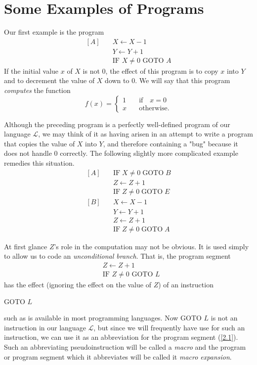 \documentclass[12pt,a4paper,twoside,openany]{book}
\begin{document}
\section{Some Examples of Programs}

Our first example is the program
\begin{equation*}
    \begin{array}{ll}[A]&\quad X\leftarrow X-1\\ &\quad Y\leftarrow Y+1\\ &\quad\text{IF }X\neq0\text{ GOTO }A\end{array}
\end{equation*}
If the initial value $x$ of $X$ is not 0,  the effect of this program is to copy $x$ into $Y$ and to decrement the value of $X$ down to 0. We will say that this program \textit{computes} the function $$f(x)=\left\{\begin{matrix}1&\quad\text{if}\quad x=0\\x&\quad\text{otherwise.}\end{matrix}\right.$$

Although the preceding program is a perfectly well-defined program of our language $\mathscr{L}$,  we may think of it as having arisen in an attempt to write a program that copies the value of $X$ into $Y$, and therefore containing a "bug" because it does not handle 0 correctly. The following slightly more complicated example remedies this situation.
\begin{equation*}
    \begin{aligned}[A]\quad&\mathrm{IF}\;X\neq0\;\mathrm{GOTO}\;B\\&Z\leftarrow Z+1\\&\mathrm{IF}\;Z\neq0\;\mathrm{GOTO}\;E\\ [B]\quad&X\leftarrow X-1\\&Y\leftarrow Y+1\\&Z\leftarrow Z+1\\&\mathrm{IF}\;Z\neq0\;\mathrm{GOTO}\;A\end{aligned}
\end{equation*}

At first glance $Z$'s role in the computation may not be obvious. It is used simply to allow us to code an \textit{unconditional branch}. That is, the program segment
\begin{equation}
    \begin{aligned}&Z\leftarrow Z+1\\&\text{IF }Z\neq 0\text{ GOTO }L\end{aligned}
    \label{2.1}
\end{equation}
has the effect (ignoring the effect on the value of $Z$) of an instruction
\begin{center}
    GOTO $L$
\end{center}
such as is available in most programming languages. Now GOTO $L$ is not an instruction in our language $\mathscr{L}$, but since we will frequently have use for such an instruction, we can use it as an abbreviation for the program segment (\ref{2.1}). Such an abbreviating pseudoinstruction will be called a \textit{macro} and the program or program segment which it abbreviates will be called it \textit{macro expansion}.
\end{document}
